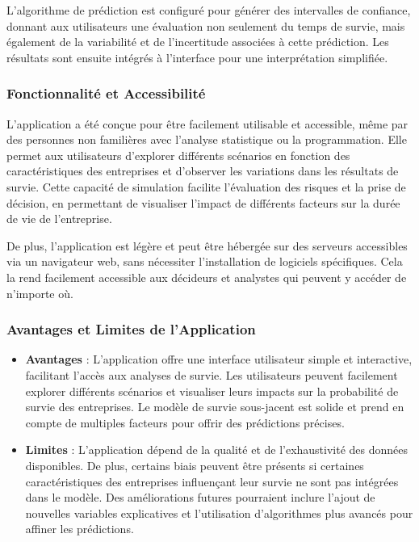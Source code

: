 \documentclass[a4paper,12pt]{report}
\begin{document}
L'algorithme de prédiction est configuré pour générer des intervalles de confiance, donnant aux utilisateurs une évaluation non seulement du temps de survie, mais également de la variabilité et de l'incertitude associées à cette prédiction. Les résultats sont ensuite intégrés à l'interface pour une interprétation simplifiée.

\subsubsection{Fonctionnalité et Accessibilité}

L'application a été conçue pour être facilement utilisable et accessible, même par des personnes non familières avec l'analyse statistique ou la programmation. Elle permet aux utilisateurs d'explorer différents scénarios en fonction des caractéristiques des entreprises et d'observer les variations dans les résultats de survie. Cette capacité de simulation facilite l’évaluation des risques et la prise de décision, en permettant de visualiser l'impact de différents facteurs sur la durée de vie de l'entreprise.

De plus, l'application est légère et peut être hébergée sur des serveurs accessibles via un navigateur web, sans nécessiter l’installation de logiciels spécifiques. Cela la rend facilement accessible aux décideurs et analystes qui peuvent y accéder de n'importe où.

\subsubsection{Avantages et Limites de l'Application}

\begin{itemize}
    \item \textbf{Avantages} : L'application offre une interface utilisateur simple et interactive, facilitant l'accès aux analyses de survie. Les utilisateurs peuvent facilement explorer différents scénarios et visualiser leurs impacts sur la probabilité de survie des entreprises. Le modèle de survie sous-jacent est solide et prend en compte de multiples facteurs pour offrir des prédictions précises.
    \item \textbf{Limites} : L'application dépend de la qualité et de l'exhaustivité des données disponibles. De plus, certains biais peuvent être présents si certaines caractéristiques des entreprises influençant leur survie ne sont pas intégrées dans le modèle. Des améliorations futures pourraient inclure l'ajout de nouvelles variables explicatives et l'utilisation d'algorithmes plus avancés pour affiner les prédictions.
\end{itemize}
\end{document}
